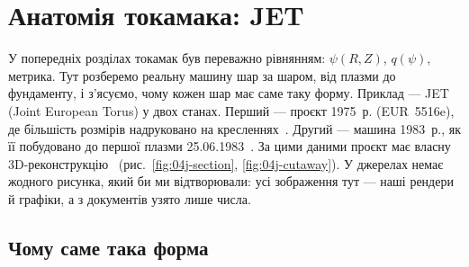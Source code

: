 \chapter{Анатомія токамака: JET}\label{ch:jet}


У попередніх розділах токамак був переважно рівнянням: $\psi(R,Z)$, $q(\psi)$, метрика. Тут розберемо реальну машину шар за шаром, від плазми до фундаменту, і з'ясуємо, чому кожен шар має саме таку форму. Приклад --- JET (Joint European Torus) у двох станах. Перший --- проєкт 1975~р. (EUR~5516e), де більшість розмірів надруковано на кресленнях~\cite{JET1975}. Другий --- машина 1983~р., як її побудовано до першої плазми 25.06.1983~\cite{JETJU1983}. За цими даними проєкт має власну 3D-реконструкцію~\cite{ProjJET} (рис.~\ref{fig:04j-section}, \ref{fig:04j-cutaway}). У джерелах немає жодного рисунка, який би ми відтворювали: усі зображення тут --- наші рендери й графіки, а з документів узято лише числа.

\section{Чому саме така форма}\label{sec:04j-shape}

